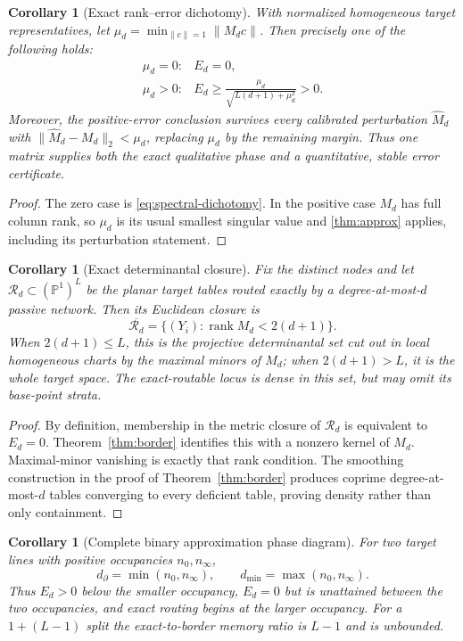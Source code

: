 \documentclass[11pt]{article}
\newtheorem{corollary}[theorem]{Corollary}
\theoremstyle{definition}\newtheorem{definition}[theorem]{Definition}\newtheorem{example}[theorem]{Example}
\theoremstyle{remark}\newtheorem{remark}[theorem]{Remark}\newtheorem{limitation}[theorem]{Limitation}
\newcommand{\PP}{\mathbb P}\newcommand{\rank}{\operatorname{rank}}
\newcommand{\norm}[1]{\lVert#1\rVert}\newcommand{\dd}{\,\mathrm d}
\begin{document}
\begin{corollary}[Exact rank--error dichotomy]\label{cor:rank-error}
With normalized homogeneous target representatives, let
$\mu_d=\min_{\norm{c}=1}\norm{M_dc}$.  Then precisely one of the following
holds:
\[
 \begin{array}{ll}
 \mu_d=0:& E_d=0,\\[1mm]
 \mu_d>0:& \displaystyle
 E_d\ge\frac{\mu_d}{\sqrt{L(d+1)+\mu_d^2}}>0.
 \end{array}
\]
Moreover, the positive-error conclusion survives every calibrated perturbation
$\widehat M_d$ with
$\norm{\widehat M_d-M_d}_2<\mu_d$, replacing $\mu_d$ by the remaining margin.
Thus one matrix supplies both the exact qualitative phase and a quantitative,
stable error certificate.
\end{corollary}

\begin{proof}
The zero case is \eqref{eq:spectral-dichotomy}.  In the positive case $M_d$
has full column rank, so $\mu_d$ is its usual smallest singular value and
\cref{thm:approx} applies, including its perturbation statement.
\end{proof}

\begin{corollary}[Exact determinantal closure]\label{cor:determinantal-closure}
Fix the distinct nodes and let $\mathcal R_d\subset(\PP^1)^L$ be the planar
target tables routed exactly by a degree-at-most-$d$ passive network.  Then
its Euclidean closure is
\[
 \overline{\mathcal R_d}
 =\{(Y_i):\rank M_d<2(d+1)\}.
\]
When $2(d+1)\le L$, this is the projective determinantal set cut out in local
homogeneous charts by the maximal minors of $M_d$; when $2(d+1)>L$, it is the
whole target space.  The exact-routable locus is dense in this set, but may
omit its base-point strata.
\end{corollary}

\begin{proof}
By definition, membership in the metric closure of $\mathcal R_d$ is
equivalent to $E_d=0$.  Theorem~\ref{thm:border} identifies this with a
nonzero kernel of $M_d$.  Maximal-minor vanishing is exactly that rank
condition.  The smoothing construction in the proof of
Theorem~\ref{thm:border} produces coprime degree-at-most-$d$ tables converging
to every deficient table, proving density rather than only containment.
\end{proof}

\begin{corollary}[Complete binary approximation phase diagram]\label{cor:binary-border}
For two target lines with positive occupancies $n_0,n_\infty$,
\begin{equation}\label{eq:binary-border}
 d_\partial=\min(n_0,n_\infty),\qquad
 d_{\min}=\max(n_0,n_\infty).
\end{equation}
Thus $E_d>0$ below the smaller occupancy, $E_d=0$ but is unattained between
the two occupancies, and exact routing begins at the larger occupancy.  For a
$1+(L-1)$ split the exact-to-border memory ratio is $L-1$ and is unbounded.
\end{corollary}
\end{document}
